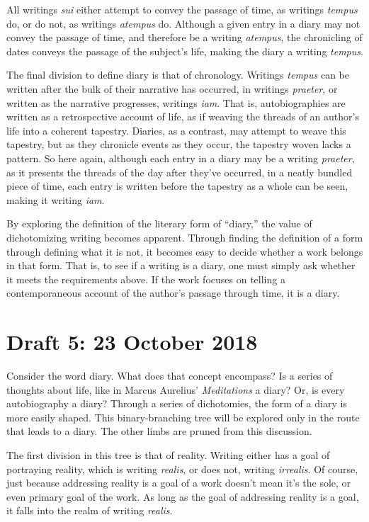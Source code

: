 \documentclass[12pt]{article}[titlepage]
\newcommand{\say}[1]{``#1''}
\newcommand{\1}{\={a}}
\newcommand{\2}{\={e}}
\newcommand{\3}{\={\i}}
\newcommand{\4}{\=o}
\newcommand{\5}{\=u}
\newcommand{\6}{\={A}}
\renewcommand{\,}{\textsuperscript{,}}
\begin{document}
All writings \textit{sui} either attempt to convey the passage of time, as writings \textit{tempus} do, or do not, as writings \textit{atempus} do.
Although a given entry in a diary may not convey the passage of time, and therefore be a writing \textit{atempus}, the chronicling of dates conveys the passage of the subject's life, making the diary a writing \textit{tempus}.

The final division to define diary is that of chronology.
Writings \textit{tempus} can be written after the bulk of their narrative has occurred, in writings \textit{praeter}, or written as the narrative progresses, writings \textit{iam}.
That is, autobiographies are written as a retrospective account of life, as if weaving the threads of an  author's life into a coherent tapestry.
Diaries, as a contrast, may attempt to weave this tapestry, but as they chronicle events as they occur, the tapestry woven lacks a pattern.
So here again, although each entry in a diary may be a writing \textit{praeter}, as it presents the threads of the day after they've occurred, in a neatly bundled piece of time, each entry is written before the tapestry as a whole can be seen, making it writing \textit{iam}.

By exploring the definition of the literary form of \say{diary,} the value of dichotomizing writing becomes apparent.
Through finding the definition of a form through defining what it is not, it becomes easy to decide whether a work belongs in that form.
That is, to see if a writing is a diary, one must simply ask whether it meets the requirements above.
If the work focuses on telling a contemporaneous account of the author's passage through time, it is a diary.
 
\section{Draft 5: 23 October 2018}
Consider the word diary.
What does that concept encompass?
Is a series of thoughts about life, like in Marcus Aurelius' \textit{Meditations} a diary?
Or, is every autobiography a diary?
Through a series of dichotomies, the form of a diary is more easily shaped. 
This binary-branching tree will be explored only in the route that leads to a diary.
The other limbs are pruned from this discussion.

The first division in this tree is that of reality.
Writing either has a goal of portraying reality, which is writing \textit{realis}, or does not, writing \textit{irrealis}.
Of course, just because addressing reality is a goal of a work doesn't mean it's the sole, or even primary goal of the work.
As long as the goal of addressing reality is a goal, it falls into the realm of writing \textit{realis}.
\end{document}

